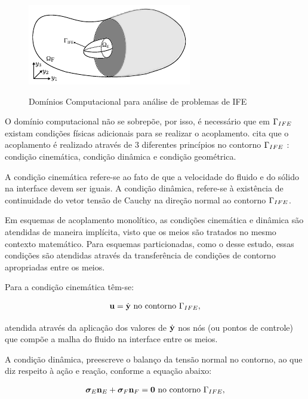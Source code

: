 \begin{figure}[!htbp]
	\caption{Domínios Computacional para análise de problemas de IFE}
	\centering 
	\includegraphics[scale=2.0,trim=0cm 0cm 0cm 0.0cm, clip=true]{Imagens/Cap7/dominioIFE.pdf}	
	\label{fig:dominioIFE}
\end{figure}

O domínio computacional não se sobrepõe, por isso, é necessário que em $\Gamma_{IFE}$ existam condições físicas adicionais para se realizar o acoplamento.  cita que o acoplamento é realizado através de 3 diferentes princípios no contorno $\Gamma_{IFE}$ : condição cinemática, condição dinâmica e condição geométrica.

A condição cinemática refere-se ao fato de que a velocidade do fluido e do sólido na interface devem ser iguais. A condição dinâmica, refere-se à existência de continuidade do vetor tensão de Cauchy na direção normal ao contorno $\Gamma_{IFE}$.

Em esquemas de acoplamento monolítico, as condições cinemática e dinâmica são atendidas de maneira implícita, visto que os meios são tratados no mesmo contexto matemático. Para esquemas particionadas, como o desse estudo, essas condições são atendidas através da transferência de condições de contorno apropriadas entre os meios.

Para a condição cinemática têm-se:

\begin{align}
	\mathbf{u} = \dot{\mathbf{y}} \ \textrm{no contorno} \ \Gamma_{IFE},
\end{align}

\noindent atendida através da aplicação dos valores de $\dot{\mathbf{y}}$ nos nós (ou pontos de controle) que compõe a malha do fluido na interface entre os meios.

A condição dinâmica, preescreve o balanço da tensão normal no contorno, ao que diz respeito à ação e reação, conforme a equação abaixo:

\begin{align}
	\stressTensorS \snormalS + \stressTensorF \snormalF = \vzero \ \textrm{no contorno} \ \boundaryFSI,
\end{align}

